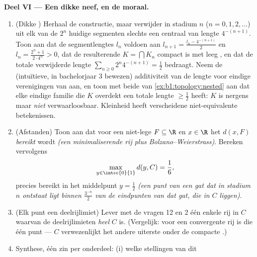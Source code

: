 \begin{problem}[{Weekendopgave --- de \omterm{pb:b1:topology:1}{Cantorverzameling} van de middelste
derden: lengte nul, overaftelbaar, perfect, en $C + C = \intcc{0}{2}$}]
\medskip
\noindent\textbf{Deel VI --- Een dikke neef, en de moraal.}
\begin{enumerate}[resume]
  \item (Dikke ) Herhaal de constructie, maar verwijder
        in stadium $n$ ($n = 0, 1, 2, \dots$) uit elk van de $2^n$
        huidige segmenten slechts een centraal   van lengte
        $4^{-(n+1)}$. Toon aan dat de segmentlengtes $l_n$ voldoen aan
        $l_{n+1} = \frac{l_n - 4^{-(n+1)}}{2}$ en $l_n = \frac{2^n +
        1}{2\cdot 4^n} > 0$, dat de resulterende $K = \bigcap K_n$
        compact is met leeg , en dat de totale verwijderde
        lengte $\sum_{n\geq0} 2^n 4^{-(n+1)} = \frac12$ bedraagt. Neem
        de (intuïtieve, in bachelorjaar 3 bewezen) additiviteit van de
        lengte voor eindige verenigingen van  aan, en toon
        met beide  van \cref{ex:b1:topology:nested} aan dat
        elke eindige familie   die $K$ overdekt een
        totale lengte $\geq \frac12$ heeft: $K$ is nergens  maar
        \emph{niet} verwaarloosbaar. Kleinheid heeft verscheidene
        niet-equivalente betekenissen.
  \item (Afstanden) Toon aan dat voor een niet-lege  $F
        \subseteq \R$ en $x \in \R$ het  $d(x, F)$
        \emph{bereikt} wordt \emph{(een minimaliserende rij plus
        Bolzano--Weierstrass)}. Bereken vervolgens
        \[
        \max_{y \in \intcc{0}{1}} d(y, C) = \frac16 ,
        \]
        precies bereikt in het middelpunt $y = \frac12$ \emph{(een punt
        van een gat dat in stadium $n$ ontstaat ligt binnen
        $\frac{3^{-n}}{2}$ van de eindpunten van dat gat, die in $C$
        liggen)}.
  \item (Elk punt een deelrijlimiet) Lever met de vragen 12 en 2 één
        enkele rij in $C$ waarvan de  deelrijlimieten
        \emph{heel} $C$ is. (Vergelijk: voor een convergente rij is die
         één punt --- $C$ verwezenlijkt het andere uiterste
        onder de compacte .)
  \item Synthese, één zin per onderdeel: (i) welke stellingen van dit

\end{enumerate}
\end{problem}
